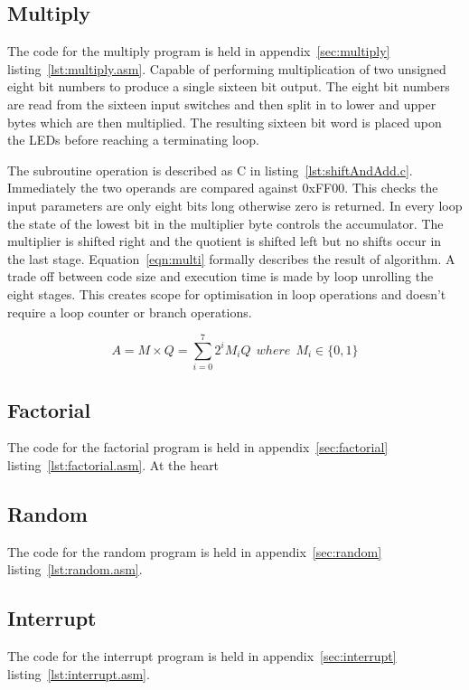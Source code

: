 \subsection{Multiply}
The code for the multiply program is held in appendix~\ref{sec:multiply} listing~\ref{lst:multiply.asm}.
Capable of performing multiplication of two unsigned eight bit numbers to produce a single sixteen bit output.
The eight bit numbers are read from the sixteen input switches and then split in to lower and upper bytes which are then multiplied.
The resulting sixteen bit word is placed upon the LEDs before reaching a terminating loop.

The subroutine operation is described as C in listing~\ref{lst:shiftAndAdd.c}. 
Immediately the two operands are compared against 0xFF00. 
This checks the input parameters are only eight bits long otherwise zero is returned.
In every loop the state of the lowest bit in the multiplier byte controls the accumulator. 
The multiplier is shifted right and the quotient is shifted left but no shifts occur in the last stage.
Equation~\eqref{eqn:multi} formally describes the result of algorithm.
A trade off between code size and execution time is made by loop unrolling the eight stages.
This creates scope for optimisation in loop operations and doesn't require a loop counter or branch operations.



\begin{equation}
   A = M \times Q = \sum_{i=0}^{7} 2^i M_i Q\:\:where\:\:M_i \in \{0,1\}
   \label{eqn:multi}
\end{equation}

\subsection{Factorial}
The code for the factorial program is held in appendix~\ref{sec:factorial} listing~\ref{lst:factorial.asm}.
At the heart

\subsection{Random}
The code for the random program is held in appendix~\ref{sec:random} listing~\ref{lst:random.asm}.

\subsection{Interrupt}
The code for the interrupt program is held in appendix~\ref{sec:interrupt} listing~\ref{lst:interrupt.asm}.

